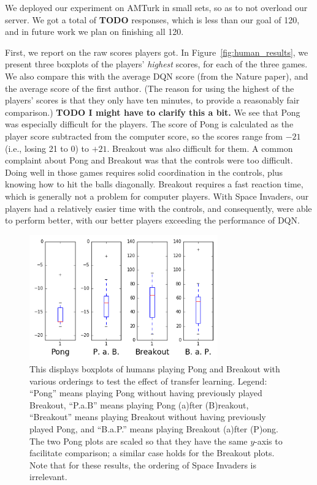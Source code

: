 \documentclass[letterpaper, 10 pt, conference]{ieeeconf}  %
\begin{document}
We deployed our experiment on AMTurk in small sets, so as to not overload our server. We got a total
of \textbf{TODO} responses, which is less than our goal of 120, and in future work we plan on
finishing all 120.

First, we report on the raw scores players got. In Figure~\ref{fig:human_results}, we present three
boxplots of the players' \emph{highest} scores, for each of the three games. We also compare this
with the average DQN score (from the Nature paper), and the average score of the first author. (The
reason for using the highest of the players' scores is that they only have ten minutes, to provide a
reasonably fair comparison.) \textbf{TODO I might have to clarify this a bit.} We see that Pong was
especially difficult for the players. The score of Pong is calculated as the player score subtracted
from the computer score, so the scores range from $-21$ (i.e., losing 21 to 0) to $+21$. Breakout
was also difficult for them. A common complaint about Pong and Breakout was that the controls were
too difficult. Doing well in those games requires solid coordination in the controls, plus knowing
how to hit the balls diagonally. Breakout requires a fast reaction time, which is generally not a
problem for computer players. With Space Invaders, our players had a relatively easier time with the
controls, and consequently, were able to perform better, with our better players exceeding the
performance of DQN.

\begin{figure}[t]
\centering
\includegraphics[width=3.2in]{fig_boxplots_transfer_learning}
\caption{This displays boxplots of humans playing Pong and Breakout with various orderings to test
the effect of transfer learning. Legend: ``Pong'' means playing Pong without having previously
played Breakout, ``P.a.B'' means playing Pong (a)fter (B)reakout, ``Breakout'' means playing
Breakout without having previously played Pong, and ``B.a.P.'' means playing Breakout (a)fter
(P)ong. The two Pong plots are scaled so that they have the same $y$-axis to facilitate comparison;
a similar case holds for the Breakout plots. Note that for these results, the ordering of Space
Invaders is irrelevant.}
\label{fig:human_transfer}
\end{figure}
\end{document}
